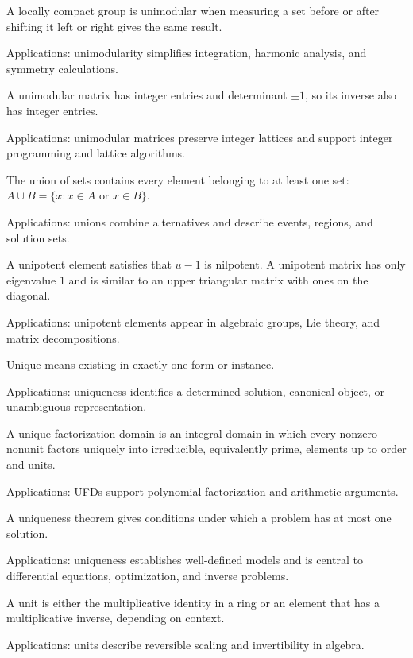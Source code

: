 A locally compact group is unimodular when measuring a set before or after shifting it left or right gives the same result. \par\noindent Applications: unimodularity simplifies integration, harmonic analysis, and symmetry calculations.

A unimodular matrix has integer entries and determinant $\pm1$, so its inverse also has integer entries. \par\noindent Applications: unimodular matrices preserve integer lattices and support integer programming and lattice algorithms.

The union of sets contains every element belonging to at least one set: $A\cup B=\{x:x\in A\text{ or }x\in B\}$. \par\noindent Applications: unions combine alternatives and describe events, regions, and solution sets.

A unipotent element satisfies that $u-1$ is nilpotent. A unipotent matrix has only eigenvalue $1$ and is similar to an upper triangular matrix with ones on the diagonal. \par\noindent Applications: unipotent elements appear in algebraic groups, Lie theory, and matrix decompositions.

Unique means existing in exactly one form or instance. \par\noindent Applications: uniqueness identifies a determined solution, canonical object, or unambiguous representation.

A unique factorization domain is an integral domain in which every nonzero nonunit factors uniquely into irreducible, equivalently prime, elements up to order and units. \par\noindent Applications: UFDs support polynomial factorization and arithmetic arguments.

A uniqueness theorem gives conditions under which a problem has at most one solution. \par\noindent Applications: uniqueness establishes well-defined models and is central to differential equations, optimization, and inverse problems.

A unit is either the multiplicative identity in a ring or an element that has a multiplicative inverse, depending on context. \par\noindent Applications: units describe reversible scaling and invertibility in algebra.

